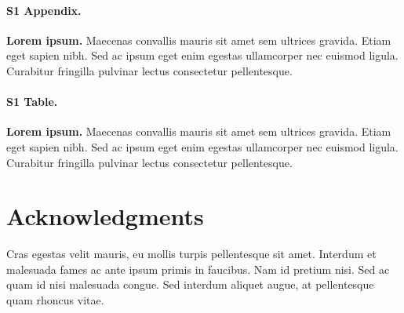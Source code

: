 \documentclass[10pt,letterpaper]{article}
\begin{document}
\paragraph*{S1 Appendix.}
\label{S1_Appendix}
{\bf Lorem ipsum.} Maecenas convallis mauris sit amet sem ultrices gravida. Etiam eget sapien nibh. Sed ac ipsum eget enim egestas ullamcorper nec euismod ligula. Curabitur fringilla pulvinar lectus consectetur pellentesque.

\paragraph*{S1 Table.}
\label{S1_Table}
{\bf Lorem ipsum.} Maecenas convallis mauris sit amet sem ultrices gravida. Etiam eget sapien nibh. Sed ac ipsum eget enim egestas ullamcorper nec euismod ligula. Curabitur fringilla pulvinar lectus consectetur pellentesque.

\section*{Acknowledgments}
Cras egestas velit mauris, eu mollis turpis pellentesque sit amet. Interdum et malesuada fames ac ante ipsum primis in faucibus. Nam id pretium nisi. Sed ac quam id nisi malesuada congue. Sed interdum aliquet augue, at pellentesque quam rhoncus vitae.

\nolinenumbers

%
%
% 




\begin{thebibliography}{10}
\end{thebibliography}
\end{document}

